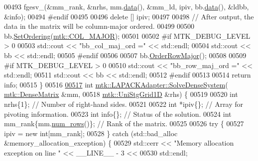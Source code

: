 \begin{DoxyCode}
00493   fgesv\_(&mm\_rank, &nrhs, mm.\hyperlink{classmtk_1_1DenseMatrix_a16b3ff56feb2658b9fc7147d1de4d8e7}{data}(), &mm\_ld, ipiv, bb.\hyperlink{classmtk_1_1DenseMatrix_a16b3ff56feb2658b9fc7147d1de4d8e7}{data}(), &ldbb, &info);
00494 \textcolor{preprocessor}{  #endif}
00495 
00496   \textcolor{keyword}{delete} [] ipiv;
00497 
00498   \textcolor{comment}{// After output, the data in the matrix will be column-major ordered.}
00499 
00500   bb.\hyperlink{classmtk_1_1DenseMatrix_aacae136ae446cad8f0d81476e83efb39}{SetOrdering}(\hyperlink{namespacemtk_ga622801bd9f912d0f976c3e383f5f581ca7c11989c132253fb76b8f6b1314f7e13}{mtk::COL\_MAJOR});
00501 
00502 \textcolor{preprocessor}{  #if MTK\_DEBUG\_LEVEL > 0}
00503   std::cout << \textcolor{stringliteral}{"bb\_col\_maj\_ord ="} << std::endl;
00504   std::cout << bb << std::endl;
00505 \textcolor{preprocessor}{  #endif}
00506 
00507   bb.\hyperlink{classmtk_1_1DenseMatrix_ac2949efba3e8278335d45418c85433e4}{OrderRowMajor}();
00508 
00509 \textcolor{preprocessor}{  #if MTK\_DEBUG\_LEVEL > 0}
00510   std::cout << \textcolor{stringliteral}{"bb\_row\_maj\_ord ="} << std::endl;
00511   std::cout << bb << std::endl;
00512 \textcolor{preprocessor}{  #endif}
00513 
00514   \textcolor{keywordflow}{return} info;
00515 \}
00516 
\hypertarget{mtk__lapack__adapter_8cc_source_l00517}{}\hyperlink{classmtk_1_1LAPACKAdapter_ac38be1e30a2456b2a14c8a81f47c4ba1}{00517} \textcolor{keywordtype}{int} \hyperlink{classmtk_1_1LAPACKAdapter_a7428bccf74fd4a4af68fb7233846da22}{mtk::LAPACKAdapter::SolveDenseSystem}(
      \hyperlink{classmtk_1_1DenseMatrix}{mtk::DenseMatrix} &mm,
00518                                          \hyperlink{classmtk_1_1UniStgGrid1D}{mtk::UniStgGrid1D} &rhs) \{
00519 
00520   \textcolor{keywordtype}{int} nrhs\{1\};  \textcolor{comment}{// Number of right-hand sides.}
00521 
00522   \textcolor{keywordtype}{int} *ipiv\{\};                \textcolor{comment}{// Array for pivoting information.}
00523   \textcolor{keywordtype}{int} info\{\};                 \textcolor{comment}{// Status of the solution.}
00524   \textcolor{keywordtype}{int} mm\_rank\{mm.\hyperlink{classmtk_1_1DenseMatrix_a17d8d3b9cc0926044b6972dd190a5c21}{num\_rows}()\}; \textcolor{comment}{// Rank of the matrix.}
00525 
00526   \textcolor{keywordflow}{try} \{
00527     ipiv = \textcolor{keyword}{new} \textcolor{keywordtype}{int}[mm\_rank];
00528   \} \textcolor{keywordflow}{catch} (std::bad\_alloc &memory\_allocation\_exception) \{
00529     std::cerr << \textcolor{stringliteral}{"Memory allocation exception on line "} << \_\_LINE\_\_ - 3 <<
00530       std::endl;

\end{DoxyCode}
